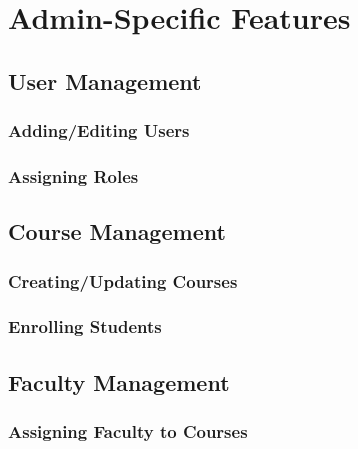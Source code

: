 \newpage
\section{Admin-Specific Features}

\subsection{User Management}

\subsubsection{Adding/Editing Users}

\subsubsection{Assigning Roles}

\subsection{Course Management}

\subsubsection{Creating/Updating Courses}

\subsubsection{Enrolling Students}

\subsection{Faculty Management}

\subsubsection{Assigning Faculty to Courses}